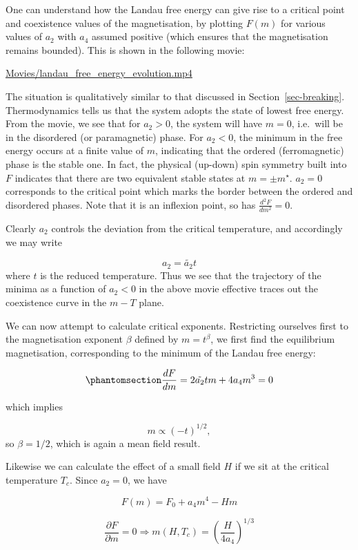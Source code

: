\documentclass[
  letterpaper,
  enabledeprecatedfontcommands]{report}
\begin{document}
One can understand how the Landau free energy can give rise to a
critical point and coexistence values of the magnetisation, by plotting
\(F(m)\) for various values of \(a_2\) with \(a_4\) assumed positive
(which ensures that the magnetisation remains bounded). This is shown in
the following movie:

\url{Movies/landau_free_energy_evolution.mp4}

The situation is qualitatively similar to that discussed in
Section~\ref{sec-breaking}. Thermodynamics tells us that the system
adopts the state of lowest free energy. From the movie, we see that for
\(a_2>0\), the system will have \(m=0\), i.e.~will be in the disordered
(or paramagnetic) phase. For \(a_2<0\), the minimum in the free energy
occurs at a finite value of \(m\), indicating that the ordered
(ferromagnetic) phase is the stable one. In fact, the physical (up-down)
spin symmetry built into \(F\) indicates that there are two equivalent
stable states at \(m=\pm m^\star\). \(a_2=0\) corresponds to the
critical point which marks the border between the ordered and disordered
phases. Note that it is an inflexion point, so has
\(\frac{d^2F}{dm^2}=0\).

Clearly \(a_2\) controls the deviation from the critical temperature,
and accordingly we may write

\[a_2=\tilde{a_2} t\] where \(t\) is the reduced temperature. Thus we
see that the trajectory of the minima as a function of \(a_2<0\) in the
above movie effective traces out the coexistence curve in the \(m-T\)
plane.

We can now attempt to calculate critical exponents. Restricting
ourselves first to the magnetisation exponent \(\beta\) defined by
\(m=t^\beta\), we first find the equilibrium magnetisation,
corresponding to the minimum of the Landau free energy:

\begin{equation}\phantomsection\label{eq-minimize}{
\frac{dF}{dm}=2\tilde{a_2} tm+4a_4m^3=0
}\end{equation}

which implies

\[m\propto (-t)^{1/2},\] so \(\beta=1/2\), which is again a mean field
result.

Likewise we can calculate the effect of a small field \(H\) if we sit at
the critical temperature \(T_c\). Since \(a_2=0\), we have

\[F(m)=F_0+a_4m^4-Hm\]

\[\frac{\partial F}{\partial m}=0 \Rightarrow m(H,T_c)=\left(\frac{H}{4a_4}\right)^{1/3}\]
\end{document}
